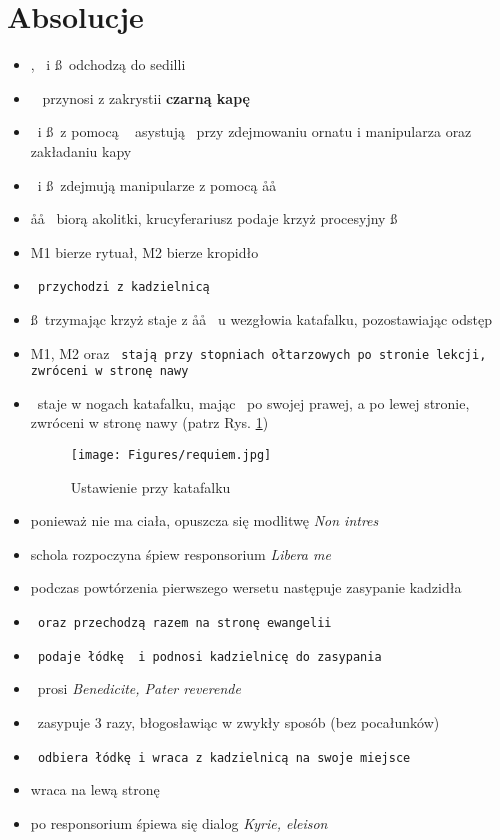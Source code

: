 \section{Absolucje}

\begin{itemize}
	\item \ii, \dd~i \ss~odchodzą do sedilli
	\item \zz~ przynosi z zakrystii \textbf{czarną kapę}
	\item \dd~i \ss~z pomocą \zz~ asystują \ii~przy zdejmowaniu ornatu i manipularza
		oraz zakładaniu kapy
	\item \dd~i \ss~zdejmują manipularze z pomocą \aa\aa~
	\item \aa\aa~ biorą akolitki, krucyferariusz podaje krzyż procesyjny \ss
	\item M1 bierze rytuał, M2 bierze kropidło
	\item \tt~przychodzi z kadzielnicą
	\item \ss~trzymając krzyż staje z \aa\aa~ u wezgłowia katafalku, pozostawiając
		odstęp
	\item M1, M2 oraz \tt~stają przy stopniach ołtarzowych po stronie lekcji,
		zwróceni w stronę nawy
	\item \ii~staje w nogach katafalku, mając \dd~po swojej prawej, a  po
		lewej stronie, zwróceni w stronę nawy (patrz Rys.
		\ref{fig:requiem})
		\begin{figure}[h]
			\centering
			\texttt{[image: Figures/requiem.jpg]}
			\caption{Ustawienie przy katafalku}
			\label{fig:requiem}
		\end{figure}
	\item ponieważ nie ma ciała, opuszcza się modlitwę \textit{Non intres}
	\item schola rozpoczyna śpiew responsorium \textit{Libera me}
	\item podczas powtórzenia pierwszego wersetu następuje zasypanie
		kadzidła
	\item \tt~oraz  przechodzą razem na stronę ewangelii
	\item \tt~podaje łódkę \dd~i podnosi kadzielnicę do zasypania
	\item \dd~prosi \textit{Benedicite, Pater reverende}
	\item \ii~zasypuje 3 razy, błogosławiąc w zwykły sposób (bez pocałunków)
	\item \tt~odbiera łódkę i wraca z kadzielnicą na swoje miejsce
	\item {} wraca na lewą stronę \ii
	\item po responsorium śpiewa się dialog \textit{Kyrie, eleison}

\end{itemize}
